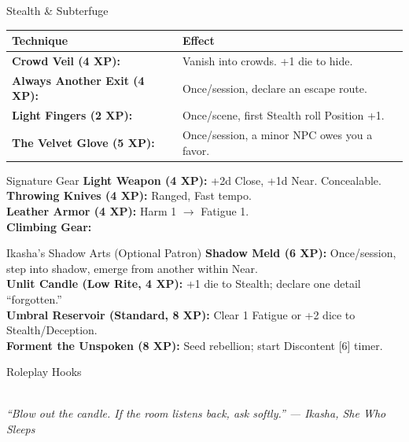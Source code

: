 \documentclass[10pt]{article}
\begin{document}
\begin{minipage}[t]{0.48\linewidth}
    \begin{charbox}{Stealth \& Subterfuge}
        \begin{tabular}{>{\bfseries}p{3cm} p{4.5cm}}
            \toprule
            \textbf{Technique} & \textbf{Effect} \\
            \midrule
            Crowd Veil (4 XP): & Vanish into crowds. +1 die to hide. \\
            Always Another Exit (4 XP): & Once/session, declare an escape route. \\
            Light Fingers (2 XP): & Once/scene, first Stealth roll Position +1. \\
            The Velvet Glove (5 XP): & Once/session, a minor NPC owes you a favor. \\
            \bottomrule
        \end{tabular}
    \end{charbox}
    
    \vspace{0.5em}
    
    \begin{charbox}{Signature Gear}
        \textbf{Light Weapon (4 XP):} +2d Close, +1d Near. Concealable.\\
        \textbf{Throwing Knives (4 XP):} Ranged, Fast tempo.\\
        \textbf{Leather Armor (4 XP):} Harm 1 $\rightarrow$ Fatigue 1.\\
        \textbf{Climbing Gear:} \underline{\hspace{4cm}}
    \end{charbox}
    
    \vspace{0.5em}
    
    \begin{charbox}{Ikasha's Shadow Arts (Optional Patron)}
        \textbf{Shadow Meld (6 XP):} Once/session, step into shadow, emerge from another within Near.\\
        \textbf{Unlit Candle (Low Rite, 4 XP):} +1 die to Stealth; declare one detail ``forgotten.''\\
        \textbf{Umbral Reservoir (Standard, 8 XP):} Clear 1 Fatigue or +2 dice to Stealth/Deception.\\
        \textbf{Forment the Unspoken (8 XP):} Seed rebellion; start Discontent [6] timer.
    \end{charbox}
    
    \vspace{0.5em}
    
    \begin{charbox}{Roleplay Hooks}
        \underline{\hspace{8cm}}\\
        \underline{\hspace{8cm}}\\
    \end{charbox}
\end{minipage}

\vspace{1em}
\begin{center}
    {\small\sffamily\itshape ``Blow out the candle. If the room listens back, ask softly.'' --- Ikasha, She Who Sleeps}
\end{center}
\end{document}
